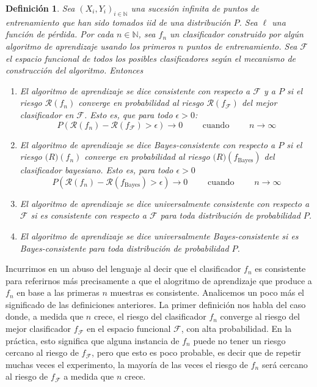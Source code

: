 \documentclass{report}
\newtheorem{dfn}{Definición}[section]
\begin{document}
\begin{dfn}
    Sea $(X_i,Y_i)_{i\in\mathbb{N}}$ una sucesión infinita de puntos de entrenamiento que han sido tomados iid de una distribución $P$.
    Sea $\ell$ una función de pérdida. Por cada $n\in \mathbb{N}$, sea $f_n$ un clasificador construido por algún algoritmo de aprendizaje
    usando los primeros $n$ puntos de entrenamiento. Sea $\mathcal{F}$ el espacio funcional de todos los posibles clasificadores según
    el mecanismo de construcción del algoritmo. Entonces
    \begin{enumerate}
    \item  El algoritmo de aprendizaje se dice \textnormal{consistente con respecto a $\mathcal{F}$ y a $P$} si el riesgo $\mathcal{R}(f_n)$
     converge en probabilidad al riesgo  $\mathcal{R}(f_{\mathcal{F}})$ del mejor clasificador en $\mathcal{F}$. Esto es,
     que para todo $\epsilon>0$:
     \[
     P\left(\mathcal{R}(f_n)-\mathcal{R}(f_{\mathcal{F}})>\epsilon\right) \rightarrow 0 \qquad \text{ cuando } \qquad n\rightarrow \infty
     \]
     \item  El algoritmo de aprendizaje se dice \textnormal{Bayes-consistente con respecto a $P$} si el riesgo $\mathcal(R)(f_n)$
     converge en probabilidad al riesgo  $\mathcal(R)(f_{\text{Bayes}})$ del clasificador bayesiano. Esto es, para todo $\epsilon>0$
    \[
     P\left(\mathcal{R}(f_n)-\mathcal{R}(f_{\text{Bayes}})>\epsilon\right) \rightarrow 0 \qquad \text{ cuando } \qquad n\rightarrow \infty
    \]
    \item  El algoritmo de aprendizaje se dice \textnormal{universalmente consistente con respecto a $\mathcal{F}$} si 
    es consistente con respecto a $\mathcal{F}$ para toda distribución de probabilidad $P$.
    \item  El algoritmo de aprendizaje se dice \textnormal{universalmente Bayes-consistente } si 
    es Bayes-consistente para toda distribución de probabilidad $P$.
    \end{enumerate}
    \label{def:consistencias}
\end{dfn}

Incurrimos en un abuso del lenguaje al decir que el clasificador $f_n$ es consistente para referirnos más precisamente a que
el alogritmo de aprendizaje que produce a $f_n$ en base a las primeras $n$ muestras es consistente. Analicemos un poco más el
significado de las definiciones anteriores. La primer definición nos habla del caso donde, a medida que $n$ crece, el riesgo
del clasificador $f_n$ converge al riesgo del mejor clasificador $f_{\mathcal{F}}$ en el espacio funcional $\mathcal{F}$, con alta probabilidad.
En la práctica, esto significa que alguna instancia de $f_n$ puede no tener un riesgo cercano al riesgo de $f_{\mathcal{F}}$, pero que esto es poco
probable, es decir que de repetir muchas veces el experimento, la mayoría de las veces el riesgo de $f_n$ será cercano al riesgo de $f_{\mathcal{F}}$
a medida que $n$ crece. \newline
\end{document}
